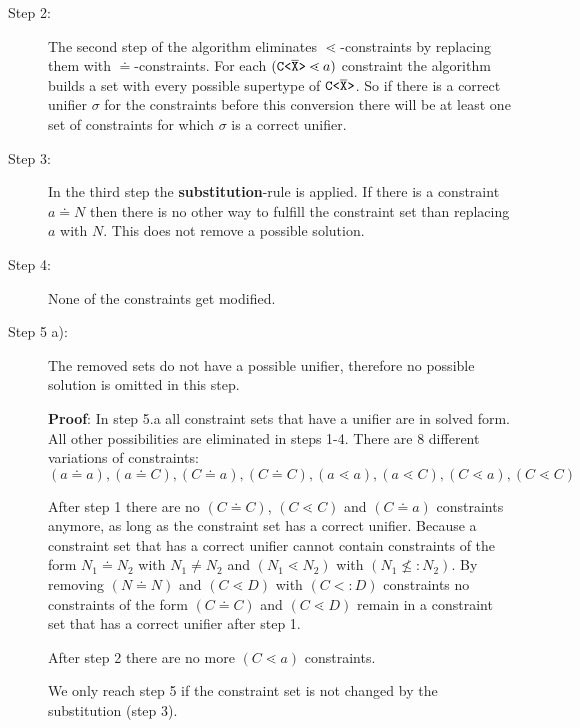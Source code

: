 \begin{description}
\item[Step 2:]
The second step of the algorithm eliminates $\lessdot$-constraints
by replacing them with $\doteq$-constraints.
For each $(\mathtt{C \texttt{<} \overline{\tt X} \texttt{>} } \lessdot a)$ constraint the algorithm builds a set with every
possible supertype of $\mathtt{C \texttt{<} \overline{\tt X} \texttt{>} }$.
So if there is a correct unifier $\sigma$ for the constraints before this conversion there will be at least one set of
constraints for which $\sigma$ is a correct unifier.

\item[Step 3:]
In the third step the \textbf{substitution}-rule is applied.
If there is a constraint $a \doteq N$ then there is no other way to fulfill the constraint set
than replacing $a$ with $N$.
This does not remove a possible solution.

\item[Step 4:]
None of the constraints get modified.

\item[Step 5 a):]
The removed sets do not have a possible unifier, therefore no possible solution is
omitted in this step.

\textbf{Proof}:
In step 5.a all constraint sets that have a unifier are in solved form.
All other possibilities are eliminated in steps 1-4.
There are 8 different variations of constraints:\\
$(a \doteq a), (a \doteq C), (C \doteq a), (C \doteq C), (a \lessdot a), (a \lessdot C), (C \lessdot a), (C \lessdot C)$

After step 1 there are no $(C \doteq C)$, $(C \lessdot C)$ and $(C \doteq a)$ constraints anymore,
as long as the constraint set has a correct unifier.
Because a constraint set that has a correct unifier cannot contain constraints of the form $N_1 \doteq N_2$ with $N_1 \neq N_2$ and
$(N_1 \lessdot N_2)$ with $(N_1 \nleq: N_2)$.
By removing $(N \doteq N)$ and $(C \lessdot D)$ with $(C <: D)$ constraints
no constraints of the form $(C \doteq C)$ and $(C \lessdot D)$
remain in a constraint set that has a correct unifier after step 1.

After step 2 there are no more $(C \lessdot a)$ constraints.


We only reach step 5 if the constraint set is not changed by the substitution (step 3).



\end{description}
